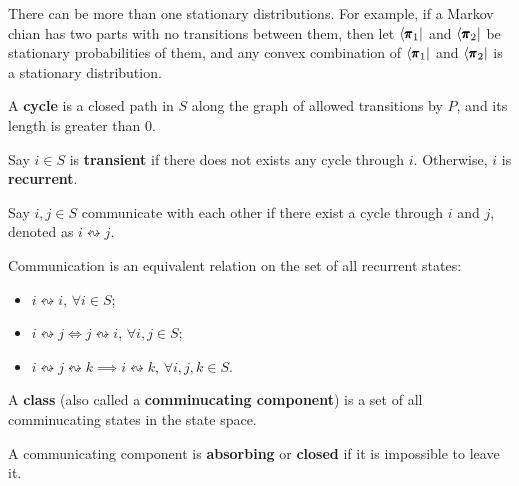 \begin{remark}
    There can be more than one stationary distributions. For example, if a Markov chian has two parts with no transitions between them, then let $\left<\pmb{\pi}_1\right|$ and $\left< \pmb{\pi}_2 \right|$ be stationary probabilities of them, and any convex combination of $\left<\pmb{\pi}_1\right|$ and $\left< \pmb{\pi}_2 \right|$ is a stationary distribution.
\end{remark}

\begin{definition}[Cycles]
    A \textbf{cycle} is a closed path in $S$ along the graph of allowed transitions by $P$, and its length is greater than $0$.
\end{definition}

\begin{definition}
    Say $i \in S$ is \textbf{transient} if there does not exists any cycle through $i$. Otherwise, $i$ is \textbf{recurrent}.
\end{definition}

\begin{definition}[Communication]
    Say $i,j \in S$ communicate with each other if there exist a cycle through $i$ and $j$, denoted as $i \leftrightsquigarrow j$.
\end{definition}

\begin{proposition}
    Communication is an equivalent relation on the set of all recurrent states:
    \begin{itemize}
        \item $i \leftrightsquigarrow i$, $\forall i \in S$;
        \item $i \leftrightsquigarrow j \iff j \leftrightsquigarrow i$, $\forall i,j \in S$;
        \item $i \leftrightsquigarrow j \leftrightsquigarrow k \implies i \leftrightsquigarrow k$, $\forall i,j,k \in S$.
    \end{itemize}
\end{proposition}

\begin{definition}
    A \textbf{class} (also called a \textbf{comminucating component}) is a set of all comminucating states in the state space.
\end{definition}

\begin{definition}
    A communicating component is \textbf{absorbing} or \textbf{closed} if it is impossible to leave it.
\end{definition}

